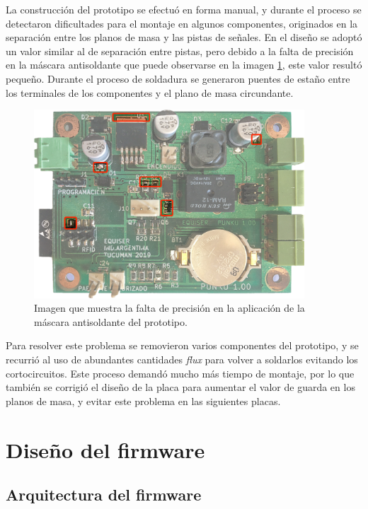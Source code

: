 La construcción del prototipo se efectuó en forma manual, y durante el proceso se detectaron dificultades para el montaje en algunos componentes, originados en la separación entre los planos de masa y las pistas de señales. En el diseño se adoptó un valor similar al de separación entre pistas, pero debido a la falta de precisión en la máscara antisoldante que puede observarse en la imagen \ref{fig:ProblemasMascara}, este valor resultó pequeño. Durante el proceso de soldadura se generaron puentes de estaño entre los terminales de los componentes y el plano de masa circundante.

\begin{figure}[ht]
	\centering
	\includegraphics[width=0.9\textwidth]{Figures/LadoComponentes.png}
	\caption[Problemas con la  máscara antisoldante del prototipo]{Imagen que muestra la falta de precisión en la aplicación de la máscara antisoldante del prototipo.}
	\label{fig:ProblemasMascara}
\end{figure}

Para resolver este problema se removieron varios componentes del prototipo, y se recurrió al uso de abundantes cantidades \emph{flux} para volver a soldarlos evitando los cortocircuitos. Este proceso demandó mucho más tiempo de montaje, por lo que también se corrigió el diseño de la placa para aumentar el valor de guarda en los planos de masa, y evitar este problema en las siguientes placas.

\section{Diseño del firmware}
\label{sec:firmware}

\subsection{Arquitectura del firmware}
\label{sub:Arquitectura}

